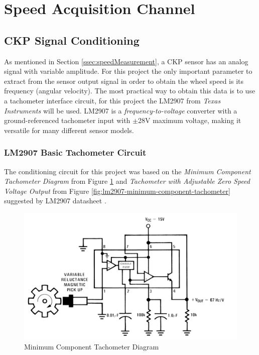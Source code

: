 \section{Speed Acquisition Channel}\label{sec:speed-acquisition-channel}

	\subsection{CKP Signal Conditioning}\label{ssec:ckp-signal-conditioning-circuit}

		As mentioned in Section \ref{ssec:speedMeasurement}, a CKP sensor has an analog signal with variable amplitude. For this project the only important parameter to extract from the sensor output signal in order to obtain the wheel speed is its frequency (angular velocity). The most practical way to obtain this data is to use a tachometer interface circuit, for this project the LM2907 from \textit{Texas Instruments} \cite{lm2907-datasheet} will be used. LM2907 is a \textit{frequency-to-voltage} converter with a ground-referenced tachometer input with $\pm$28V maximum voltage, making it versatile for many different sensor models.
		
		\subsubsection{LM2907 Basic Tachometer Circuit}\label{sssec:lm2907-basic-tachometer-circuit}
			The conditioning circuit for this project was based on the \textit{Minimum Component Tachometer Diagram } from Figure \ref{fig:lm2907-minimum-component-tachometer-diagram} and \textit{Tachometer with Adjustable Zero Speed Voltage Output} from Figure \ref{fig:lm2907-minimum-component-tachometer} suggested by LM2907 datasheet \cite{lm2907-datasheet}.

			\begin{figure}[htbp]
				\centering
				\includegraphics[width=.8\textwidth]{figuras/fig-lm2907-minimum-component-tachometer-diagram}
				\caption{Minimum Component Tachometer Diagram \cite{lm2907-datasheet}}
				\label{fig:lm2907-minimum-component-tachometer-diagram}
			\end{figure}

